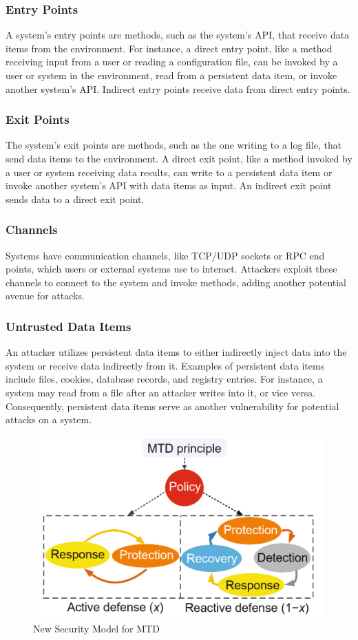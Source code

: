\subsubsection{Entry Points}
A system's entry points are methods, such as the system's API, that receive data items from the environment. For instance, a direct entry point, like a method receiving input from a user or reading a configuration file, can be invoked by a user or system in the environment, read from a persistent data item, or invoke another system's API. Indirect entry points receive data from direct entry points.

\subsubsection{Exit Points}
The system's exit points are methods, such as the one writing to a log file, that send data items to the environment. A direct exit point, like a method invoked by a user or system receiving data results, can write to a persistent data item or invoke another system's API with data items as input. An indirect exit point sends data to a direct exit point.

\subsubsection{Channels}
Systems have communication channels, like TCP/UDP sockets or RPC end points, which users or external systems use to interact. Attackers exploit these channels to connect to the system and invoke methods, adding another potential avenue for attacks.

\subsubsection{Untrusted Data Items}
An attacker utilizes persistent data items to either indirectly inject data into the system or receive data indirectly from it. Examples of persistent data items include files, cookies, database records, and registry entries. For instance, a system may read from a file after an attacker writes into it, or vice versa. Consequently, persistent data items serve as another vulnerability for potential attacks on a system.

\begin{figure}[htbp]
  \centering
  \includegraphics[width=0.7\linewidth]{img/mtd_new_ model.png}
  \caption{New Security Model for MTD\cite{mtd_security_model}}
  \label{fig:new_model}
\end{figure}


